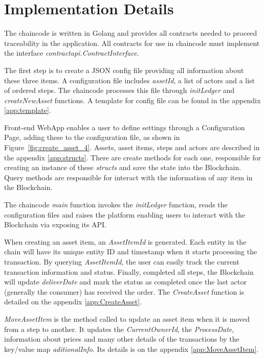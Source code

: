 \section{Implementation Details}\label{sec:Implementation}

The chaincode is written in Golang and provides all contracts needed to proceed traceability in the application. All contracts for use in chaincode must implement the interface \textit{contractapi.ContractInterface}. 

The first step is to create a JSON config file providing all information about these three items. A configuration file includes \textit{assetId}, a list of actors and a list of ordered steps. The chaincode processes this file through  \textit{initLedger} and \textit{createNewAsset} functions. A template for config file can be found in the appendix \ref{app:template}.

Front-end WebApp enables a user to define settings through a Configuration Page, adding these to the configuration file, as shown in Figure~\ref{fig:create_asset_4}. Assets, asset items, steps and actors are described in the appendix \ref{app:structs}. There are create methods for each one,  responsible for creating an instance of these \textit{structs} and save the state into the Blockchain. Query methods are responsible for interact with the information of any item in the Blockchain.

The chaincode \textit{main} function invokes the \textit{initLedger} function, reads the configuration files and raises the platform enabling users to interact with the Blockchain via exposing its API.

When creating an asset item, an \textit{AssetItemId} is generated. Each entity in the chain will have its unique entity ID and timestamp when it starts processing the transaction. By querying \textit{AssetItemId}, the user can easily track the current transaction information and status. Finally, completed all steps, the Blockchain will update \textit{deliverDate} and mark the status as completed once the last actor (generally the consumer) has received the order. The \textit{CreateAsset} function is detailed on the appendix \ref{app:CreateAsset}.


\textit{MoveAssetItem} is the method called to update an asset item when it is moved from a step to another. It updates the \textit{CurrentOwnerId}, the \textit{ProcessDate}, information about prices and many other details of the transactions by the key/value map \textit{aditionalInfo}. Its details is on the appendix \ref{app:MoveAssetItem}.

